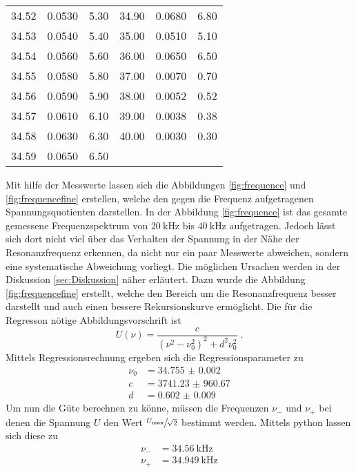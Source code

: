 \begin{table}
\begin{tabular} {S[table-format=2.2] S[table-format=1.4] S[table-format=1.2] S[table-format=2.2] S[table-format=1.4] S[table-format=1.2]}
    34.52 & 0.0530 & 5.30 & 34.90 & 0.0680 & 6.80\\
    34.53 & 0.0540 & 5.40 & 35.00 & 0.0510 & 5.10\\
    34.54 & 0.0560 & 5.60 & 36.00 & 0.0650 & 6.50\\
    34.55 & 0.0580 & 5.80 & 37.00 & 0.0070 & 0.70\\
    34.56 & 0.0590 & 5.90 & 38.00 & 0.0052 & 0.52\\
    34.57 & 0.0610 & 6.10 & 39.00 & 0.0038 & 0.38\\
    34.58 & 0.0630 & 6.30 & 40.00 & 0.0030 & 0.30\\
    34.59 & 0.0650 & 6.50 & { }   & { }    & { } \\
    \bottomrule
\end{tabular}
\end{table}
Mit hilfe der Messwerte lassen sich die Abbildungen \ref{fig:frequence} und \ref{fig:frequencefine} erstellen, welche den gegen die Frequenz
aufgetragenen Spannungsquotienten darstellen.
In der Abbildung \ref{fig:frequence} ist das gesamte gemessene Frequenzspektrum von $\SI{20}{\kilo\hertz}$ bis $\SI{40}{\kilo\hertz}$ aufgetragen.
Jedoch lässt sich dort nicht viel über das Verhalten der Spannung in der Nähe der Resonanzfrequenz erkennen, da nicht nur ein paar Messwerte abweichen, sondern eine
systematische Abweichung vorliegt. Die möglichen Ursachen werden in der Diskussion \ref{sec:Diskussion} näher erläutert.  
Dazu wurde die Abbildung \ref{fig:frequencefine} erstellt, welche den Bereich um  die Resonanzfrequenz besser darstellt und auch einen bessere 
Rekursionskurve ermöglicht.
Die für die Regresson nötige Abbildungsvorschrift ist 
\begin{equation}
    U (\nu) = \frac{c}{\left( \nu^2 - \nu_0^2 \right)^2 + d^2 \nu_0^2} \; \text{.}
\end{equation}
Mittels Regressionsrechnung ergeben sich die Regressionsparameter zu 
\begin{align*}
    \nu_0 & =\num{34.755(2)}       \\
    c     & =\num{3741.23(96067)}  \\
    d     & =\num{0.602(9)}
\end{align*}
Um nun die Güte berechnen zu könne, müssen die Frequenzen $\nu_-$ und $\nu_+$ bei denen die Spannung $U$ den Wert $\sfrac{U_\text{max}}{\sqrt{2}}$ bestimmt werden.
Mittels python lassen sich diese zu
\begin{align*}
    \nu_- &= \SI{34.56}{\kilo\hertz} \\
    \nu_+ &= \SI{34.949}{\kilo\hertz}
\end{align*}
